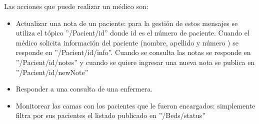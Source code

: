 Las acciones que puede realizar un médico son:
\begin{itemize}
\item Actualizar una nota de un paciente: para la gestión de estos mensajes se utiliza el tópico ''/Pacient/id'' donde id es el número de paciente. Cuando el médico solicita información del paciente (nombre, apellido y número ) se responde  en ''/Pacient/id/info''. Cuando se consulta las notas se responde en ''/Pacient/id/notes'' y cuando se quiere ingresar una nueva nota se publica en ''/Pacient/id/newNote''
\item Responder a una consulta de una enfermera.
\item Monitorear las camas con los pacientes que le fueron encargados: simplemente filtra por sus pacientes el listado publicado en ''/Beds/status''

\end{itemize}


